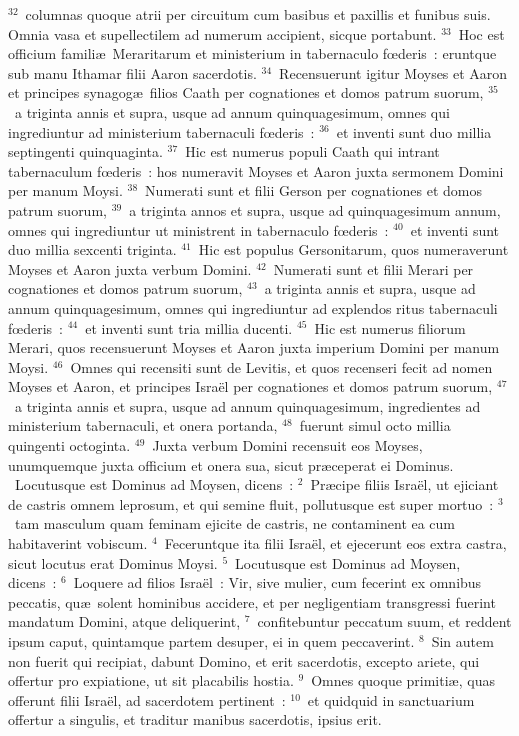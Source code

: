 ${}^{32}$~columnas quoque atrii per circuitum cum basibus et paxillis et funibus suis. Omnia vasa et supellectilem ad numerum accipient, sicque portabunt.
${}^{33}$~Hoc est officium famili\ae\ Meraritarum et ministerium in tabernaculo fœderis~: eruntque sub manu Ithamar filii Aaron sacerdotis.
${}^{34}$~Recensuerunt igitur Moyses et Aaron et principes synagog\ae\ filios Caath per cognationes et domos patrum suorum,
${}^{35}$~a triginta annis et supra, usque ad annum quinquagesimum, omnes qui ingrediuntur ad ministerium tabernaculi fœderis~:
${}^{36}$~et inventi sunt duo millia septingenti quinquaginta.
${}^{37}$~Hic est numerus populi Caath qui intrant tabernaculum fœderis~: hos numeravit Moyses et Aaron juxta sermonem Domini per manum Moysi.
${}^{38}$~Numerati sunt et filii Gerson per cognationes et domos patrum suorum,
${}^{39}$~a triginta annos et supra, usque ad quinquagesimum annum, omnes qui ingrediuntur ut ministrent in tabernaculo fœderis~:
${}^{40}$~et inventi sunt duo millia sexcenti triginta.
${}^{41}$~Hic est populus Gersonitarum, quos numeraverunt Moyses et Aaron juxta verbum Domini.
${}^{42}$~Numerati sunt et filii Merari per cognationes et domos patrum suorum,
${}^{43}$~a triginta annis et supra, usque ad annum quinquagesimum, omnes qui ingrediuntur ad explendos ritus tabernaculi fœderis~:
${}^{44}$~et inventi sunt tria millia ducenti.
${}^{45}$~Hic est numerus filiorum Merari, quos recensuerunt Moyses et Aaron juxta imperium Domini per manum Moysi.
${}^{46}$~Omnes qui recensiti sunt de Levitis, et quos recenseri fecit ad nomen Moyses et Aaron, et principes Isra\"el per cognationes et domos patrum suorum,
${}^{47}$~a triginta annis et supra, usque ad annum quinquagesimum, ingredientes ad ministerium tabernaculi, et onera portanda,
${}^{48}$~fuerunt simul octo millia quingenti octoginta.
${}^{49}$~Juxta verbum Domini recensuit eos Moyses, unumquemque juxta officium et onera sua, sicut pr\ae ceperat ei Dominus.
~Locutusque est Dominus ad Moysen, dicens~:
${}^{2}$~Pr\ae cipe filiis Isra\"el, ut ejiciant de castris omnem leprosum, et qui semine fluit, pollutusque est super mortuo~:
${}^{3}$~tam masculum quam feminam ejicite de castris, ne contaminent ea cum habitaverint vobiscum.
${}^{4}$~Feceruntque ita filii Isra\"el, et ejecerunt eos extra castra, sicut locutus erat Dominus Moysi.
${}^{5}$~Locutusque est Dominus ad Moysen, dicens~:
${}^{6}$~Loquere ad filios Isra\"el~: Vir, sive mulier, cum fecerint ex omnibus peccatis, qu\ae\ solent hominibus accidere, et per negligentiam transgressi fuerint mandatum Domini, atque deliquerint,
${}^{7}$~confitebuntur peccatum suum, et reddent ipsum caput, quintamque partem desuper, ei in quem peccaverint.
${}^{8}$~Sin autem non fuerit qui recipiat, dabunt Domino, et erit sacerdotis, excepto ariete, qui offertur pro expiatione, ut sit placabilis hostia.
${}^{9}$~Omnes quoque primiti\ae , quas offerunt filii Isra\"el, ad sacerdotem pertinent~:
${}^{10}$~et quidquid in sanctuarium offertur a singulis, et traditur manibus sacerdotis, ipsius erit.


